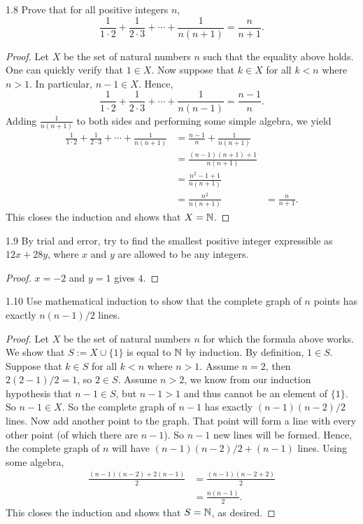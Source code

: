 \newpage
\begin{exercise}{1.8}
    Prove that for all positive integers \(n\),
    \[\frac{1}{1\cdot 2} + \frac{1}{2\cdot 3} + \cdots + \frac{1}{n(n+1)} = \frac{n}{n+1}.\]
\end{exercise}
\begin{proof}
    Let \(X\) be the set of natural numbers \(n\) such that the equality above holds.
    One can quickly verify that \(1 \in X\). Now suppose that \(k \in X\) for all \(k < n\) where \(n > 1\).
    In particular, \(n-1 \in X\). Hence, \[\frac{1}{1\cdot 2} + \frac{1}{2 \cdot 3} + \cdots + \frac{1}{n(n-1)} = \frac{n-1}{n}.\]
    Adding \(\frac{1}{n(n+1)}\) to both sides and performing some simple algebra, we yield
    \begin{align*}
        \frac{1}{1\cdot 2} + \frac{1}{2 \cdot 3} + \cdots + \frac{1}{n(n+1)} &= \frac{n-1}{n} + \frac{1}{n(n+1)}\\
        &= \frac{(n-1)(n+1) + 1}{n(n+1)}\\
        &= \frac{n^2 - 1 + 1}{n(n+1)} \\
        &= \frac{n^2}{n(n+1)}
        &= \frac{n}{n+1}.
    \end{align*}
    This closes the induction and shows that \(X = \mathbb{N}\).
\end{proof}

\begin{exercise}{1.9}
    By trial and error, try to find the smallest positive integer expressible as \(12x + 28y\), where \(x\) and \(y\)
    are allowed to be any integers.
\end{exercise}
\begin{proof}
    \(x = -2\) and \(y = 1\) gives \(4\).
\end{proof}

\begin{exercise}{1.10}
    Use mathematical induction to show that the complete graph of \(n\) points has exactly \(n(n-1)/2\) lines.
\end{exercise}
\begin{proof}
    Let \(X\) be the set of natural numbers \(n\) for which the formula above works.
    We show that \(S := X \cup \{1\}\) is equal to \(\mathbb{N}\) by induction. By definition, \(1 \in S\). Suppose
    that \(k \in S\) for all \(k < n\) where \(n > 1\). Assume \(n = 2\), then \(2(2-1)/2 = 1\), so \(2 \in S\).
    Assume \(n > 2\), we know from our induction hypothesis that \(n-1 \in S\), but \(n-1 > 1\) and thus cannot be an element of \(\{1\}\).
    So \(n-1 \in X\). So the complete graph of \(n-1\) has exactly \((n-1)(n-2)/2\) lines. Now add another point to the graph. That point will form a line with every other point (of which there are \(n-1\)).
    So \(n-1\) new lines will be formed. Hence, the complete graph of \(n\) will have \((n-1)(n-2)/2 + (n-1)\) lines.
    Using some algebra,
    \begin{align*}
        \frac{(n-1)(n-2) + 2(n-1)}{2} &= \frac{(n-1)(n-2 + 2)}{2} \\
        &= \frac{n(n-1)}{2}.
    \end{align*}
    This closes the induction and shows that \(S = \mathbb{N}\), as desired.
\end{proof}

